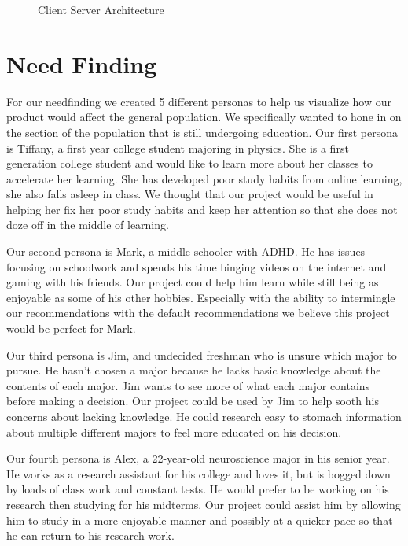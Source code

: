 \documentclass[letterpaper]{article} %
\begin{document}
\begin{figure}
	\caption{Client Server Architecture}
	\label{fig:client/server}
\end{figure}


\section{Need Finding}

For our needfinding we created 5 different personas to help us visualize how our product would affect the general population. We specifically wanted to hone in on the section of the population that is still undergoing education. Our first persona is Tiffany, a first year college student majoring in physics. She is a first generation college student and would like to learn more about her classes to accelerate her learning. She has developed poor study habits from online learning, she also falls asleep in class. We thought that our project would be useful in helping her fix her poor study habits and keep her attention so that she does not doze off in the middle of learning. 

Our second persona is Mark, a middle schooler with ADHD. He has issues focusing on schoolwork and spends his time binging videos on the internet and gaming with his friends. Our project could help him learn while still being as enjoyable as some of his other hobbies. Especially with the ability to intermingle our recommendations with the default recommendations we believe this project would be perfect for Mark. 

Our third persona is Jim, and undecided freshman who is unsure which major to pursue. He hasn't chosen a major because he lacks basic knowledge about the contents of each major. Jim wants to see more of what each major contains before making a decision. Our project could be used by Jim to help sooth his concerns about lacking knowledge. He could research easy to stomach information about multiple different majors to feel more educated on his decision. 

Our fourth persona is Alex, a 22-year-old neuroscience major in his senior year.  He works as a research assistant for his college and loves it, but is bogged down by loads of class work and constant tests. He would prefer to be working on his research then studying for his midterms. Our project could assist him by allowing him to study in a more enjoyable manner and possibly at a quicker pace so that he can return to his research work. 
\end{document}
